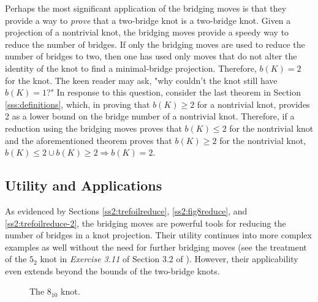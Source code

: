 \documentclass[titlepage]{article}
\begin{document}
Perhaps the most significant application of the bridging moves is that they provide a way to \emph{prove} that a two-bridge knot is a two-bridge knot. Given a projection of a nontrivial knot, the bridging moves provide a speedy way to reduce the number of bridges. If only the bridging moves are used to reduce the number of bridges to two, then one has used only moves that do not alter the identity of the knot to find a minimal-bridge projection. Therefore, $b(K)=2$ for the knot. The keen reader may ask, "why couldn't the knot still have $b(K)=1$?" In response to this question, consider the last theorem in Section \ref{sss:definitions}, which, in proving that $b(K)\geq 2$ for a nontrivial knot, provides 2 as a lower bound on the bridge number of a nontrivial knot. Therefore, if a reduction using the bridging moves proves that $b(K)\leq 2$ for the nontrivial knot and the aforementioned theorem proves that $b(K)\geq 2$ for the nontrivial knot, $b(K)\leq 2 \cup b(K)\geq 2\Rightarrow b(K)=2$.


\subsection{Utility and Applications}\label{sss:utility}
As evidenced by Sections \ref{ss2:trefoilreduce}, \ref{ss2:fig8reduce}, and \ref{ss2:trefoilreduce-2}, the bridging moves are powerful tools for reducing the number of bridges in a knot projection. Their utility continues into more complex examples as well without the need for further bridging moves (see the treatment of the $5_2$ knot in \emph{Exercise 3.11} of Section 3.2 of \cite{bib:knotnotes}). However, their applicability even extends beyond the bounds of the two-bridge knots.\par

\begin{figure}[h!]
    \centering
    \vspace{-1.5em}
    \caption{The $8_{10}$ knot.}
    \label{fig:810}
\end{figure}
\end{document}
